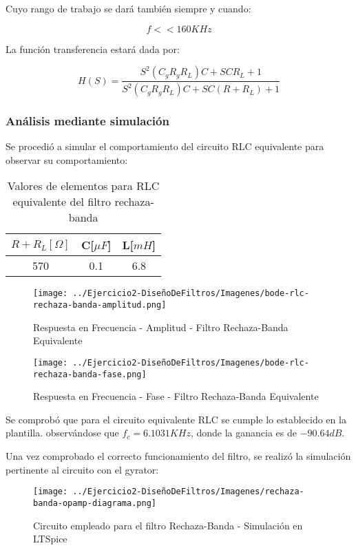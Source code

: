 Cuyo rango de trabajo se dará también siempre y cuando:

$$f << 160 KHz$$

La función transferencia estará dada por:

$$H(S)=\frac{S^{2}(C_gR_gR_L)C + SCR_L + 1}{S^2(C_gR_gR_L)C+ SC(R+R_L)+1}$$

\subsubsection{Análisis mediante simulación}

Se procedió a simular el comportamiento del circuito RLC equivalente para observar su comportamiento:

\begin{table}[H]
    \centering
    \begin{tabular}{|c|c|c|}
    \hline
    \rowcolor[HTML]{C0C0C0} 
    $R+R_L[\Omega]$ & C[$\mu F$] & L[$mH$]  \\ \hline
    570      & 0.1  & 6.8 \\ \hline
    \end{tabular}
    \caption{Valores de elementos para RLC equivalente del filtro rechaza-banda}
    \end{table}

\begin{figure}[H]
    \centering
    \texttt{[image: ../Ejercicio2-DiseñoDeFiltros/Imagenes/bode-rlc-rechaza-banda-amplitud.png]}
    \caption{Respuesta en Frecuencia - Amplitud - Filtro Rechaza-Banda Equivalente}
\end{figure}

\begin{figure}[H]
    \centering
    \texttt{[image: ../Ejercicio2-DiseñoDeFiltros/Imagenes/bode-rlc-rechaza-banda-fase.png]}
    \caption{Respuesta en Frecuencia - Fase - Filtro Rechaza-Banda Equivalente}
\end{figure}

Se comprobó que para el circuito equivalente RLC  se cumple lo establecido en la plantilla.
observándose que $f_c=6.1031 KHz$, donde la ganancia es de $-90.64 dB$.

Una vez comprobado el correcto funcionamiento del filtro, se realizó la simulación pertinente al circuito
con el gyrator:

\begin{figure}[H]
    \centering
    \texttt{[image: ../Ejercicio2-DiseñoDeFiltros/Imagenes/rechaza-banda-opamp-diagrama.png]}
    \caption{Circuito empleado para el filtro Rechaza-Banda - Simulación en LTSpice}
\end{figure}

